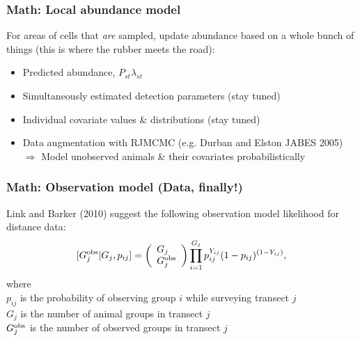 \documentclass[serif,mathserif]{beamer}
\begin{document}
\begin{frame}
  \frametitle{Math: Local abundance model}
  For areas of cells that {\it are} sampled, update abundance based on a whole bunch of things (this is where the rubber meets the road):
      \begin{itemize}
        \item Predicted abundance, $P_{st}\lambda_{st}$ \pause
        \item Simultaneously estimated detection parameters (stay tuned) \pause
        \item Individual covariate values \& distributions (stay tuned) \pause
        \item Data augmentation with RJMCMC (e.g. Durban and Elston JABES 2005) \pause \\
        {\color{noaaturq} $\Rightarrow$ Model unobserved animals \& their covariates probabilistically}
      \end{itemize}
\end{frame}

\begin{frame}
  \frametitle{Math: Observation model (Data, finally!)}
        Link and Barker (2010) suggest the following observation model likelihood
        for distance data:
         $$
         [G_j^{\rm obs} | G_j, p_{ij}]=
        \left( \begin{array}{l}
        G_j \\
        G_j^{\rm obs}
        \end{array} \right)
        \prod_{i=1}^{G_j} p_{ij}^{Y_{ij}} (1-p_{ij})^{(1-Y_{ij})},
        $$
        where \\
        $p_{ij}$ is the probability of observing group $i$ while surveying transect $j$ \\
        $G_j$ is the number of animal groups in transect $j$ \\
        $G_j^{\rm obs}$ is the number of observed groups in transect $j$
\end{frame}
\end{document}
